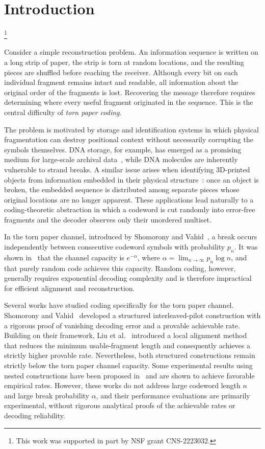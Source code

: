 \documentclass[journal,letterpaper,onecolumn,11pt]{IEEEtran}
\begin{document}
\section{Introduction}
{\let\thefootnote\relax\footnote{
This work was supported in part by NSF grant CNS-2223032.}}

Consider a simple reconstruction problem. An information sequence is written on a long strip of paper, the strip is torn at random locations, and the resulting pieces are shuffled before reaching the receiver. Although every bit on each individual fragment remains intact and readable, all information about the original order of the fragments is lost. 
Recovering the message therefore requires determining where every useful fragment originated in the sequence. This is the central difficulty of \emph{torn paper coding}.

The problem is motivated by storage and identification systems in which physical fragmentation can destroy positional context without necessarily corrupting the symbols themselves. DNA storage, for example, has emerged as a promising medium for large-scale archival data~\cite{douglas2012logic,goldman2013towards,blawat2016forward,antkowiak2020low}, while DNA molecules are inherently vulnerable to strand breaks. A similar issue arises when identifying 3D-printed objects from information embedded in their physical structure~\cite{wang2024secureinformationembeddingextraction}: once an object is broken, the embedded sequence is distributed among separate pieces whose original locations are no longer apparent. These applications lead naturally to a coding-theoretic abstraction in which a codeword is cut randomly into error-free fragments and the decoder observes only their unordered multiset.

In the torn paper channel, introduced by Shomorony and Vahid~\cite{shomorony2021torn}, a break occurs independently between consecutive codeword symbols with probability $p_n$. 
It was shown in~\cite{shomorony2021torn} that the channel capacity is $e^{-\alpha}$, where $\alpha=\lim_{n\to\infty}p_n\log n$, and that purely random code achieves this capacity. 
Random coding, however, generally requires exponential decoding complexity and is therefore impractical for efficient alignment and reconstruction.

Several works have studied coding specifically for the torn paper channel. 
Shomorony and Vahid~\cite{shomorony2021torn} developed a structured interleaved-pilot construction with a rigorous proof of vanishing decoding error and a provable achievable rate. 
Building on their framework, Liu et al.~\cite{liu2026improved} introduced a local alignment method that reduces the minimum usable-fragment length and consequently achieves a strictly higher provable rate.
Nevertheless, both structured constructions remain strictly below the torn paper channel capacity.
Some experimental results using nested constructions have been proposed in~\cite{nassirpour2023dna,jiao2025efficient} and are shown to achieve favorable empirical rates. 
However, these works do not address large codeword length $n$ and large break probability $\alpha$, and their performance evaluations are primarily experimental, without rigorous analytical proofs of the achievable rates or decoding reliability.
\end{document}
